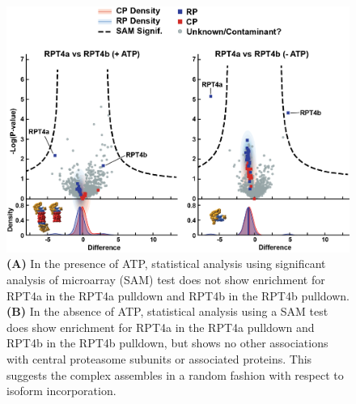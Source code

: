 \begin{figure}[ht]
	\centering
	\includegraphics[width=\columnwidth]{Proteasome/supprpt4avsrpt4b.png}
	{\textbf{(A)} In the presence of ATP, statistical analysis using significant analysis of microarray (SAM) test does not show enrichment for RPT4a in the RPT4a pulldown and RPT4b in the RPT4b pulldown. \textbf{(B)} In the absence of ATP, statistical analysis using a SAM test does show enrichment for RPT4a in the RPT4a pulldown and RPT4b in the RPT4b pulldown, but shows no other associations with central proteasome subunits or associated proteins. This suggests the complex assembles in a random fashion with respect to isoform incorporation.}
	\label{fig:suprpt4avsrpt4b}
\end{figure}

